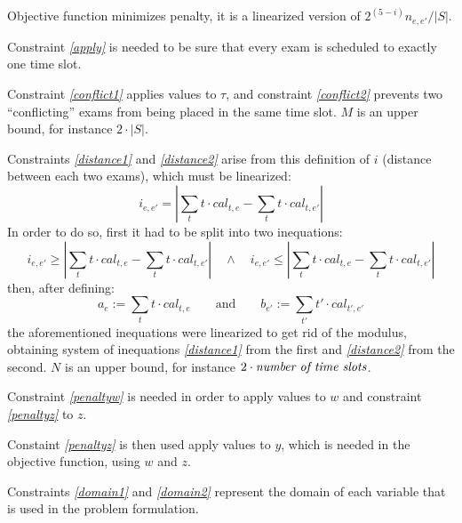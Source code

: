 \documentclass[11pt, a4paper, leqno]{article}
\newcommand{\eq}[1]{\textit{\ref{#1}}}
\begin{document}
	Objective function minimizes penalty, it is a linearized version of $2^{(5-i)}n_{e,e'}/\left|S\right|$.
	
	Constraint \eq{apply} is needed to be sure that every exam is scheduled to exactly one time slot.
	
	Constraint \eq{conflict1} applies values to $\tau$, and constraint \eq{conflict2} prevents two ``conflicting'' exams from being placed in the same time slot. $M$ is an upper bound, for instance $2\cdot\left|S\right|$.
	
	Constraints \eq{distance1} and \eq{distance2} arise from this definition of $i$ (distance between each two exams), which must be linearized:
	\[
	i_{e,e'} = \left|\sum_{t} t\cdot cal_{t,e} - \sum_{t} t\cdot cal_{t,e'}\right|
	\]
	In order to do so, first it had to be split into two inequations:
	\[
		i_{e,e'} \geq \left|\sum_{t} t\cdot cal_{t,e} - \sum_{t} t\cdot cal_{t,e'}\right| \quad \land \quad i_{e,e'} \leq \left|\sum_{t} t\cdot cal_{t,e} - \sum_{t} t\cdot cal_{t,e'}\right|
	\]
	then, after defining:
	\[
	a_e := \sum_{t} t\cdot cal_{t,e} \qquad\text{and}\qquad b_{e'} := \sum_{t'} t'\cdot cal_{t',e'}
	\]
	the aforementioned inequations were linearized to get rid of the modulus, obtaining system of inequations \eq{distance1} from the first and \eq{distance2} from the second. $N$ is an upper bound, for instance \mbox{$2\cdot\text{\textit{number of time slots}}$}.

	Constraint \eq{penaltyw} is needed in order to apply values to $w$ and constraint \eq{penaltyz} to $z$.
	
	Constaint \eq{penaltyz} is then used apply values to $y$, which is needed in the objective function, using $w$ and $z$.
	
	Constraints \eq{domain1} and \eq{domain2} represent the domain of each variable that is used in the problem formulation.
\end{document}
